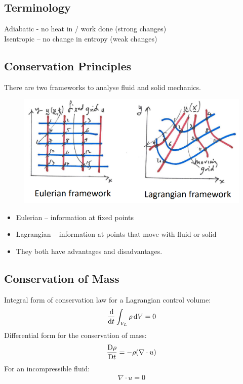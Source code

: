 \subsection{Terminology}
Adiabatic - no heat in / work done (strong changes) \\
Isentropic – no change in entropy (weak changes)
\subsection{Conservation Principles}
There are two frameworks to analyse fluid and solid mechanics.
\begin{figure}[H]
    \centering
    \includegraphics[width = 0.8 \textwidth]{./img/diagram2.PNG}
    \caption{}
\end{figure}
\begin{itemize}[noitemsep]
    \item Eulerian – information at fixed points
    \item Lagrangian – information at points that move with fluid or solid
    \item They both have advantages and disadvantages.
\end{itemize}
\subsection{Conservation of Mass}Integral form of conservation law for a Lagrangian control volume:
\begin{gather}
    \frac{\dif}{\dif t}\int_{V_L} \rho \dif V = 0
\end{gather}
Differential form for the conservation of mass:
\begin{gather}
    \frac{\Dif \rho}{\Dif t} = -\rho(\nabla \cdot u)
\end{gather}
For an incompressible fluid:
\begin{gather}
    \nabla \cdot u = 0
\end{gather}

